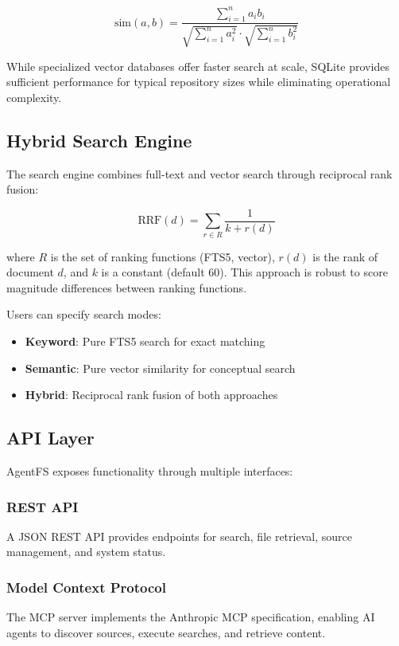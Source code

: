 \documentclass[conference]{IEEEtran}
\begin{document}
\begin{equation}
    \text{sim}(a, b) = \frac{\sum_{i=1}^{n} a_i b_i}{\sqrt{\sum_{i=1}^{n} a_i^2} \cdot \sqrt{\sum_{i=1}^{n} b_i^2}}
\end{equation}

While specialized vector databases offer faster search at scale, SQLite provides sufficient performance for typical repository sizes while eliminating operational complexity.

\subsection{Hybrid Search Engine}

The search engine combines full-text and vector search through reciprocal rank fusion:

\begin{equation}
    \text{RRF}(d) = \sum_{r \in R} \frac{1}{k + r(d)}
\end{equation}

where $R$ is the set of ranking functions (FTS5, vector), $r(d)$ is the rank of document $d$, and $k$ is a constant (default 60). This approach is robust to score magnitude differences between ranking functions.

Users can specify search modes:

\begin{itemize}
    \item \textbf{Keyword}: Pure FTS5 search for exact matching
    \item \textbf{Semantic}: Pure vector similarity for conceptual search
    \item \textbf{Hybrid}: Reciprocal rank fusion of both approaches
\end{itemize}

\subsection{API Layer}

AgentFS exposes functionality through multiple interfaces:

\subsubsection{REST API}
A JSON REST API provides endpoints for search, file retrieval, source management, and system status.

\subsubsection{Model Context Protocol}
The MCP server implements the Anthropic MCP specification, enabling AI agents to discover sources, execute searches, and retrieve content.
\end{document}
